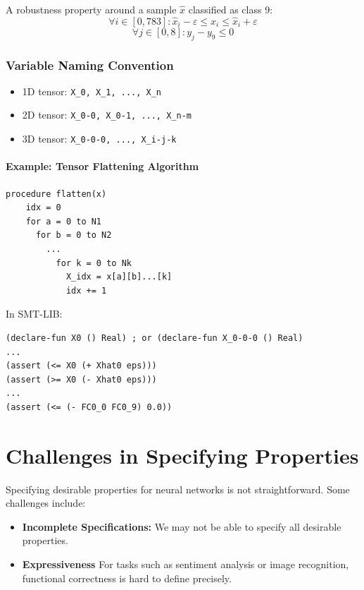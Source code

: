 A robustness property around a sample $\hat{x}$ classified as class 9:
\[
\forall i \in [0, 783] : \hat{x}_i - \varepsilon \leq x_i \leq \hat{x}_i + \varepsilon
\]
\[
\forall j \in [0,8] : y_j - y_9 \leq 0
\]

\subsubsection*{Variable Naming Convention}
\begin{itemize}
    \item 1D tensor: \texttt{X\_0, X\_1, ..., X\_n}
    \item 2D tensor: \texttt{X\_0-0, X\_0-1, ..., X\_n-m}
    \item 3D tensor: \texttt{X\_0-0-0, ..., X\_i-j-k}
\end{itemize}

\paragraph{Example: Tensor Flattening Algorithm}
\begin{lstlisting}
procedure flatten(x)
    idx = 0
    for a = 0 to N1
      for b = 0 to N2
        ...
          for k = 0 to Nk
            X_idx = x[a][b]...[k]
            idx += 1
\end{lstlisting}

\noindent In SMT-LIB:
\begin{lstlisting}
(declare-fun X0 () Real) ; or (declare-fun X_0-0-0 () Real)
...
(assert (<= X0 (+ Xhat0 eps)))
(assert (>= X0 (- Xhat0 eps)))
...
(assert (<= (- FC0_0 FC0_9) 0.0))
\end{lstlisting}


\section{Challenges in Specifying Properties}

Specifying desirable properties for neural networks is not straightforward. Some challenges include:
\begin{itemize}
    \item \textbf{Incomplete Specifications:} We may not be able to specify all desirable properties.
    \item \textbf{Expressiveness} For tasks such as sentiment analysis or image recognition, functional correctness is hard to define precisely.
\end{itemize}






